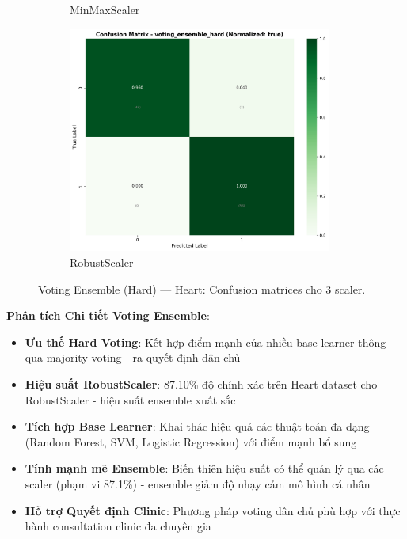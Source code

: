 \begin{figure}[H]
\begin{subfigure}[b]{0.31\textwidth}
\caption{MinMaxScaler}\label{fig:voting_heart_cm_minmax}
\end{subfigure}\hfill
\begin{subfigure}[b]{0.31\textwidth}\centering
\includegraphics[width=0.95\textwidth]{Result/heart_dataset/confusion_matrices/voting_ensemble_hard_numeric_dataset_RobustScaler.png}
\caption{RobustScaler}\label{fig:voting_heart_cm_robust}
\end{subfigure}
\caption{Voting Ensemble (Hard) — Heart: Confusion matrices cho 3 scaler.}
\label{fig:voting_heart_confusions}
\end{figure}

\textbf{Phân tích Chi tiết Voting Ensemble}:
\begin{itemize}
    \item \textbf{Ưu thế Hard Voting}: Kết hợp điểm mạnh của nhiều base learner thông qua majority voting - ra quyết định dân chủ
    \item \textbf{Hiệu suất RobustScaler}: 87.10\% độ chính xác trên Heart dataset cho RobustScaler - hiệu suất ensemble xuất sắc
    \item \textbf{Tích hợp Base Learner}: Khai thác hiệu quả các thuật toán đa dạng (Random Forest, SVM, Logistic Regression) với điểm mạnh bổ sung
    \item \textbf{Tính mạnh mẽ Ensemble}: Biến thiên hiệu suất có thể quản lý qua các scaler (phạm vi 87.1\%) - ensemble giảm độ nhạy cảm mô hình cá nhân
    \item \textbf{Hỗ trợ Quyết định Clinic}: Phương pháp voting dân chủ phù hợp với thực hành consultation clinic đa chuyên gia
\end{itemize}

